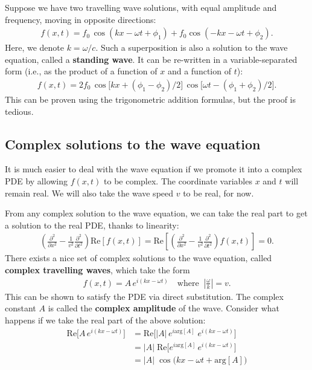 \documentclass[10pt,a4paper]{article}
\begin{document}
Suppose we have two travelling wave solutions, with equal amplitude
and frequency, moving in opposite directions:
\begin{align}
  f(x,t) = f_0 \, \cos(kx - \omega t + \phi_1) + f_0 \cos(-kx - \omega t + \phi_2).
\end{align}
Here, we denote $k = \omega/c$.  Such a superposition is also a
solution to the wave equation, called a \textbf{standing wave}. It can
be re-written in a variable-separated form (i.e., as the product of a
function of $x$ and a function of $t$):
\begin{align}
  f(x,t) = 2f_0 \, \cos\big[kx + (\phi_1-\phi_2)/2\big]\, \cos\big[\omega t - (\phi_1+\phi_2)/2\big].
  \label{eq:standing}
\end{align}
This can be proven using the trigonometric addition formulas, but the
proof is tedious.

\subsection{Complex solutions to the wave equation}
\label{complex-solutions-to-the-wave-equation}

It is much easier to deal with the wave equation if we promote it into
a complex PDE by allowing $f(x,t)$ to be complex. The coordinate
variables $x$ and $t$ will remain real. We will also take the wave
speed $v$ to be real, for now.

From any complex solution to the wave equation, we can take the real
part to get a solution to the real PDE, thanks to linearity:
\begin{align}
  \left(\frac{\partial^2}{\partial x^2} - \frac{1}{v^2} \frac{\partial^2}{\partial t^2}\right) \mathrm{Re}\left[f(x,t)\right] = \mathrm{Re} \left[ \left(\frac{\partial^2}{\partial x^2} - \frac{1}{v^2} \frac{\partial^2}{\partial t^2}\right) f(x,t)\right] = 0.
\end{align}
There exists a nice set of complex solutions to the wave equation,
called \textbf{complex travelling waves}, which take the form
\begin{align}
  f(x,t) = A \, e^{i(kx - \omega t)} \quad\mathrm{where}\;\; \left|\frac{\omega}{k}\right| = v.
\end{align}
This can be shown to satisfy the PDE via direct substitution.  The
complex constant $A$ is called the \textbf{complex amplitude} of the
wave. Consider what happens if we take the real part of the above
solution:
\begin{align}
  \mathrm{Re}\Big[A \, e^{i(kx - \omega t)}\Big] &= \mathrm{Re}\Big[ |A|\, e^{i\mathrm{arg}[A]} \; e^{i(kx - \omega t)}\Big] \\
  &= |A|\; \mathrm{Re}\Big[ e^{i\mathrm{arg}[A]} \, e^{i(kx - \omega t)}\Big] \\
  &= |A|\; \cos\!\big(kx - \omega t + \mathrm{arg}[A]\big)
\end{align}
\end{document}
